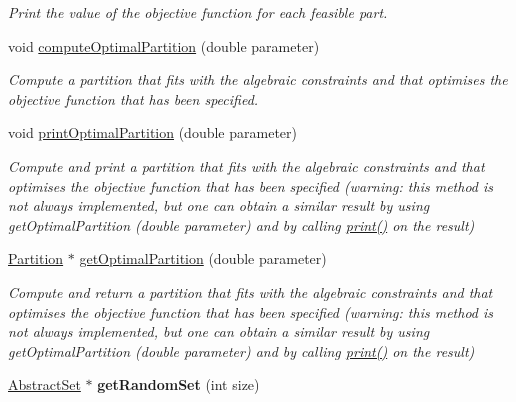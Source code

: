 \begin{DoxyCompactItemize}
\begin{DoxyCompactList}\small\item\em Print the value of the objective function for each feasible part. \end{DoxyCompactList}\item 
void \hyperlink{classRing_a196b62e9291ed1012ec89f0b2ccd489f}{compute\-Optimal\-Partition} (double parameter)
\begin{DoxyCompactList}\small\item\em Compute a partition that fits with the algebraic constraints and that optimises the objective function that has been specified. \end{DoxyCompactList}\item 
void \hyperlink{classRing_add25abfb4d058b0229a2582913118fcf}{print\-Optimal\-Partition} (double parameter)
\begin{DoxyCompactList}\small\item\em Compute and print a partition that fits with the algebraic constraints and that optimises the objective function that has been specified (warning\-: this method is not always implemented, but one can obtain a similar result by using get\-Optimal\-Partition (double parameter) and by calling \hyperlink{classRing_aecf5e7fe540e174cb718cd167f61c87e}{print()} on the result) \end{DoxyCompactList}\item 
\hyperlink{classPartition}{Partition} $\ast$ \hyperlink{classRing_ac9566fc23a18846375886fed4680b55a}{get\-Optimal\-Partition} (double parameter)
\begin{DoxyCompactList}\small\item\em Compute and return a partition that fits with the algebraic constraints and that optimises the objective function that has been specified (warning\-: this method is not always implemented, but one can obtain a similar result by using get\-Optimal\-Partition (double parameter) and by calling \hyperlink{classRing_aecf5e7fe540e174cb718cd167f61c87e}{print()} on the result) \end{DoxyCompactList}\item 
\hypertarget{classRing_a150f37e6ecbf13f553d9da97034a7ed9}{\hyperlink{classAbstractSet}{Abstract\-Set} $\ast$ {\bfseries get\-Random\-Set} (int size)}\label{classRing_a150f37e6ecbf13f553d9da97034a7ed9}

\end{DoxyCompactItemize}
